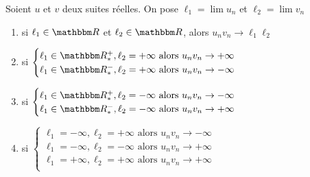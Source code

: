 \begin{prop}
	Soient $u$ et $v$ deux suites réelles. On pose $\ell_1 = \lim u_n$ et $\ell_2=\lim v_n$
	\begin{enumerate}
		\item si $\ell_1\in \R$ et $\ell_2 \in \R$, alors $u_nv_n \to \ell_1\ell_2$
		\item si $\begin{cases}
			\ell_1 \in \R^+_*, \ell_2 = +\infty \text{ alors } u_nv_n \to  +\infty\\
			\ell_1 \in \R^-_*, \ell_2 = +\infty \text{ alors } u_nv_n \to  -\infty\\
		\end{cases}$
		\item si $\begin{cases}
			\ell_1 \in \R^+_*, \ell_2 = -\infty \text{ alors } u_nv_n \to  -\infty\\
			\ell_1 \in \R^-_*, \ell_2 = -\infty \text{ alors } u_nv_n \to  +\infty\\
		\end{cases}$
		\item si $\begin{cases}
			\ell_1 = -\infty, \ell_2 = +\infty \text{ alors } u_nv_n \to  -\infty\\
			\ell_1 = -\infty, \ell_2 = -\infty \text{ alors } u_nv_n \to  +\infty\\
			\ell_1 = +\infty, \ell_2 = +\infty \text{ alors } u_nv_n \to  +\infty\\
		\end{cases}$
	\end{enumerate}
\end{prop}

